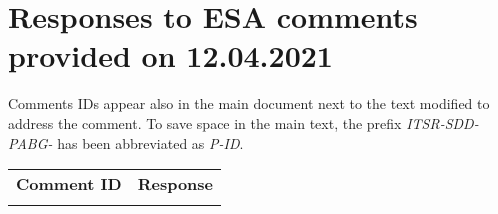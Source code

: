 
\section{Responses to ESA comments provided on 12.04.2021}
\label{sec:ESA:comments:1}

Comments IDs appear also in the main document next to the text modified to address the comment. To save space in the main text, the prefix \emph{ITSR-SDD-PABG-} has been abbreviated as \emph{P-ID}.

\setlength\LTleft{0pt}
\setlength\LTright{0pt}
\footnotesize 
\begin{longtable}{|p{1.5cm}|p{12cm}|@{}}
\textbf{Comment ID}&\textbf{Response}\\
\\
%
%
%
                                                
\end{longtable}
\normalsize

\clearpage